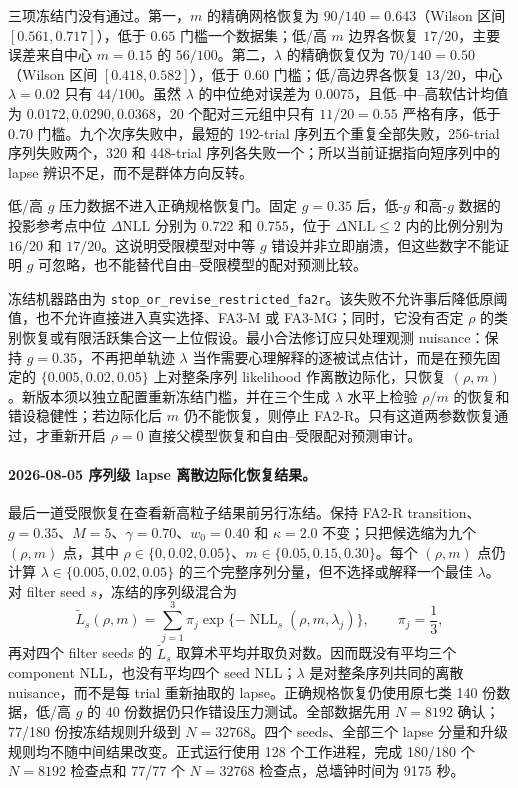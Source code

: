 三项冻结门没有通过。第一，$m$ 的精确网格恢复为 $90/140=0.643$（Wilson 区间 $[0.561,0.717]$），低于 $0.65$ 门槛一个数据集；低/高 $m$ 边界各恢复 $17/20$，主要误差来自中心 $m=0.15$ 的 $56/100$。第二，$\lambda$ 的精确恢复仅为 $70/140=0.50$（Wilson 区间 $[0.418,0.582]$），低于 $0.60$ 门槛；低/高边界各恢复 $13/20$，中心 $\lambda=0.02$ 只有 $44/100$。虽然 $\lambda$ 的中位绝对误差为 $0.0075$，且低--中--高软估计均值为 $0.0172,0.0290,0.0368$，20 个配对三元组中只有 $11/20=0.55$ 严格有序，低于 $0.70$ 门槛。九个次序失败中，最短的 192-trial 序列五个重复全部失败，256-trial 序列失败两个，320 和 448-trial 序列各失败一个；所以当前证据指向短序列中的 lapse 辨识不足，而不是群体方向反转。

低/高 $g$ 压力数据不进入正确规格恢复门。固定 $g=0.35$ 后，低-$g$ 和高-$g$ 数据的投影参考点中位 $\Delta\mathrm{NLL}$ 分别为 $0.722$ 和 $0.755$，位于 $\Delta\mathrm{NLL}\leq2$ 内的比例分别为 $16/20$ 和 $17/20$。这说明受限模型对中等 $g$ 错设并非立即崩溃，但这些数字不能证明 $g$ 可忽略，也不能替代自由--受限模型的配对预测比较。

冻结机器路由为 \texttt{stop\_or\_revise\_restricted\_fa2r}。该失败不允许事后降低原阈值，也不允许直接进入真实选择、FA3-M 或 FA3-MG；同时，它没有否定 $\rho$ 的类别恢复或有限活跃集合这一上位假设。最小合法修订应只处理观测 nuisance：保持 $g=0.35$，不再把单轨迹 $\lambda$ 当作需要心理解释的逐被试点估计，而是在预先固定的 $\{0.005,0.02,0.05\}$ 上对整条序列 likelihood 作离散边际化，只恢复 $(\rho,m)$。新版本须以独立配置重新冻结门槛，并在三个生成 $\lambda$ 水平上检验 $\rho/m$ 的恢复和错设稳健性；若边际化后 $m$ 仍不能恢复，则停止 FA2-R。只有这道两参数恢复通过，才重新开启 $\rho=0$ 直接父模型恢复和自由--受限配对预测审计。

\paragraph{2026-08-05 序列级 lapse 离散边际化恢复结果。}
最后一道受限恢复在查看新高粒子结果前另行冻结。保持 FA2-R transition、$g=0.35$、$M=5$、$\gamma=0.70$、$w_0=0.40$ 和 $\kappa=2.0$ 不变；只把候选缩为九个 $(\rho,m)$ 点，其中 $\rho\in\{0,0.02,0.05\}$、$m\in\{0.05,0.15,0.30\}$。每个 $(\rho,m)$ 点仍计算 $\lambda\in\{0.005,0.02,0.05\}$ 的三个完整序列分量，但不选择或解释一个最佳 $\lambda$。对 filter seed $s$，冻结的序列级混合为
\begin{equation}
 \widetilde L_s(\rho,m)
 =\sum_{j=1}^{3}\pi_j
   \exp\{-\operatorname{NLL}_s(\rho,m,\lambda_j)\},
 \qquad \pi_j=\frac{1}{3},
 \label{eq:model0804-lapse-marginal}
\end{equation}
再对四个 filter seeds 的 $\widetilde L_s$ 取算术平均并取负对数。因而既没有平均三个 component NLL，也没有平均四个 seed NLL；$\lambda$ 是对整条序列共同的离散 nuisance，而不是每 trial 重新抽取的 lapse。正确规格恢复仍使用原七类 140 份数据，低/高 $g$ 的 40 份数据仍只作错设压力测试。全部数据先用 $N=8192$ 确认；77/180 份按冻结规则升级到 $N=32768$。四个 seeds、全部三个 lapse 分量和升级规则均不随中间结果改变。正式运行使用 128 个工作进程，完成 180/180 个 $N=8192$ 检查点和 77/77 个 $N=32768$ 检查点，总墙钟时间为 9175 秒。

